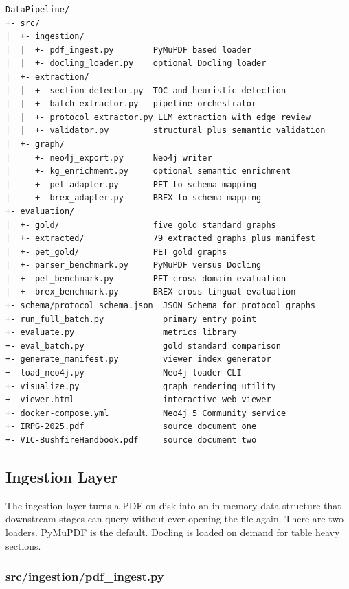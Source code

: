 \documentclass{article}
\begin{document}
\begin{tcolorbox}[colback=mygray, colframe=mygray, sharp corners, boxrule=0pt]
\begin{verbatim}
DataPipeline/
+- src/
|  +- ingestion/
|  |  +- pdf_ingest.py        PyMuPDF based loader
|  |  +- docling_loader.py    optional Docling loader
|  +- extraction/
|  |  +- section_detector.py  TOC and heuristic detection
|  |  +- batch_extractor.py   pipeline orchestrator
|  |  +- protocol_extractor.py LLM extraction with edge review
|  |  +- validator.py         structural plus semantic validation
|  +- graph/
|     +- neo4j_export.py      Neo4j writer
|     +- kg_enrichment.py     optional semantic enrichment
|     +- pet_adapter.py       PET to schema mapping
|     +- brex_adapter.py      BREX to schema mapping
+- evaluation/
|  +- gold/                   five gold standard graphs
|  +- extracted/              79 extracted graphs plus manifest
|  +- pet_gold/               PET gold graphs
|  +- parser_benchmark.py     PyMuPDF versus Docling
|  +- pet_benchmark.py        PET cross domain evaluation
|  +- brex_benchmark.py       BREX cross lingual evaluation
+- schema/protocol_schema.json  JSON Schema for protocol graphs
+- run_full_batch.py            primary entry point
+- evaluate.py                  metrics library
+- eval_batch.py                gold standard comparison
+- generate_manifest.py         viewer index generator
+- load_neo4j.py                Neo4j loader CLI
+- visualize.py                 graph rendering utility
+- viewer.html                  interactive web viewer
+- docker-compose.yml           Neo4j 5 Community service
+- IRPG-2025.pdf                source document one
+- VIC-BushfireHandbook.pdf     source document two
\end{verbatim}
\end{tcolorbox}

\subsection{Ingestion Layer}

The ingestion layer turns a PDF on disk into an in memory data
structure that downstream stages can query without ever opening the
file again. There are two loaders. PyMuPDF is the default. Docling is
loaded on demand for table heavy sections.

\subsubsection{src/ingestion/pdf\_ingest.py}
\end{document}
